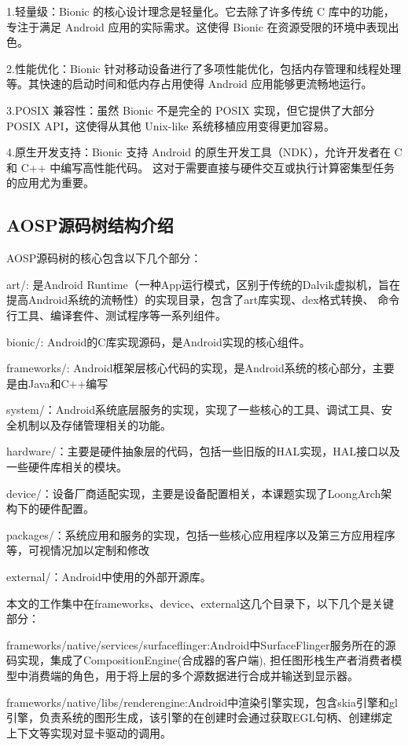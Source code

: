 1.轻量级：Bionic 的核心设计理念是轻量化。它去除了许多传统 C 库中的功能，专注于满足 Android 应用的实际需求。这使得 Bionic 
在资源受限的环境中表现出色。

2.性能优化：Bionic 针对移动设备进行了多项性能优化，包括内存管理和线程处理等。其快速的启动时间和低内存占用使得 
Android 应用能够更流畅地运行。

3.POSIX 兼容性：虽然 Bionic 不是完全的 POSIX 实现，但它提供了大部分 POSIX API，这使得从其他 Unix-like 
系统移植应用变得更加容易。

4.原生开发支持：Bionic 支持 Android 的原生开发工具（NDK），允许开发者在 C 和 C++ 中编写高性能代码。
这对于需要直接与硬件交互或执行计算密集型任务的应用尤为重要。

\subsection{AOSP源码树结构介绍}
AOSP源码树的核心包含以下几个部分：

  art/: 是Android Runtime（一种App运行模式，区别于传统的Dalvik虚拟机，旨在提高Android系统的流畅性）的实现目录，包含了art库实现、dex格式转换、
  命令行工具、编译套件、测试程序等一系列组件。

  bionic/: Android的C库实现源码，是Android实现的核心组件。

  frameworks/: Android框架层核心代码的实现，是Android系统的核心部分，主要是由Java和C++编写

  system/：Android系统底层服务的实现，实现了一些核心的工具、调试工具、安全机制以及存储管理相关的功能。

  hardware/：主要是硬件抽象层的代码，包括一些旧版的HAL实现，HAL接口以及一些硬件库相关的模块。

  device/：设备厂商适配实现，主要是设备配置相关，本课题实现了LoongArch架构下的硬件配置。

  packages/：系统应用和服务的实现，包括一些核心应用程序以及第三方应用程序等，可视情况加以定制和修改

  external/：Android中使用的外部开源库。

  本文的工作集中在frameworks、device、external这几个目录下，以下几个是关键部分：

  frameworks/native/services/surfaceflinger:Android中SurfaceFlinger服务所在的源码实现，集成了CompositionEngine(合成器的客户端),
  担任图形栈生产者消费者模型中消费端的角色，用于将上层的多个源数据进行合成并输送到显示器。

  frameworks/native/libs/renderengine:Android中渲染引擎实现，包含skia引擎和gl引擎，负责系统的图形生成，该引擎的在创建时会通过获取EGL句柄、创建绑定上下文等实现对显卡驱动的调用。

